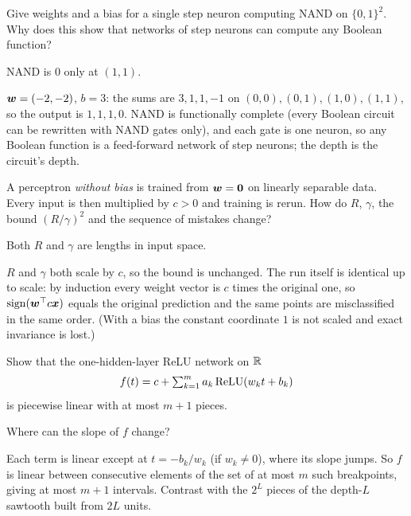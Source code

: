 \begin{problem}\onechili
	Give weights and a bias for a single step neuron computing NAND on
	$\{0,1\}^2$. Why does this show that networks of step neurons can compute any
	Boolean function?
	\begin{hint}NAND is $0$ only at $(1,1)$.\end{hint}
	\begin{sol}
		${\bm{w}}=(-2,-2)$, $b=3$: the sums are $3,1,1,-1$ on $(0,0),(0,1),(1,0),(1,1)$, so
		the output is $1,1,1,0$. NAND is functionally complete (every Boolean circuit can
		be rewritten with NAND gates only), and each gate is one neuron, so any Boolean
		function is a feed-forward network of step neurons; the depth is the circuit's depth.
	\end{sol}
\end{problem}

\begin{problem}\onechili
	A perceptron \emph{without bias} is trained from ${\bm{w}}={\bm{0}}$ on linearly separable
	data. Every input is then multiplied by $c>0$ and training is rerun. How do $R$,
	$\gamma$, the bound $(R/\gamma)^2$ and the sequence of mistakes change?
	\begin{hint}Both $R$ and $\gamma$ are lengths in input space.\end{hint}
	\begin{sol}
		$R$ and $\gamma$ both scale by $c$, so the bound is unchanged. The run itself is
		identical up to scale: by induction every weight vector is $c$ times the original
		one, so $\operatorname{sign}({\bm{w}}^{\top} c{\bm{x}})$ equals the original prediction and the same points are
		misclassified in the same order. (With a bias the constant coordinate $1$ is not
		scaled and exact invariance is lost.)
	\end{sol}
\end{problem}

\begin{problem}\twochili
	Show that the one-hidden-layer ReLU network on $\mathbb R$
	\[ f(t)=c+\textstyle\sum_{k=1}^m a_k\operatorname{ReLU}(w_kt+b_k) \]
	is piecewise linear with at most $m+1$ pieces.
	\begin{hint}Where can the slope of $f$ change?\end{hint}
	\begin{sol}
		Each term is linear except at $t=-b_k/w_k$ (if $w_k\ne0$), where its slope jumps.
		So $f$ is linear between consecutive elements of the set of at most $m$ such
		breakpoints, giving at most $m+1$ intervals. Contrast with the $2^L$ pieces of the
		depth-$L$ sawtooth built from $2L$ units.
	\end{sol}
\end{problem}

